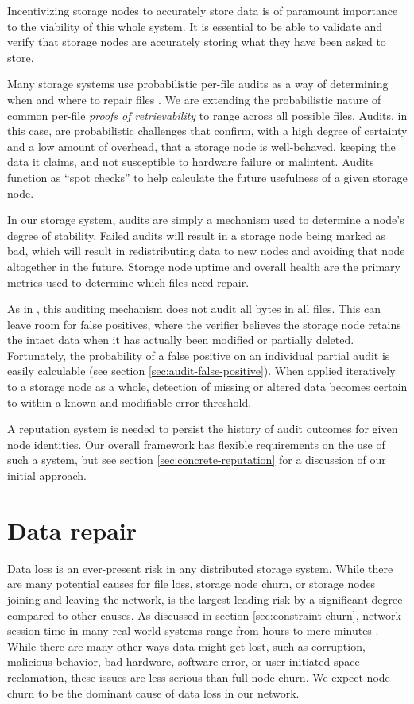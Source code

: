 \documentclass[8pt,fleqn,openany]{book}
\begin{document}
Incentivizing storage nodes to accurately store data is of paramount importance
to
the viability of this whole system. It is essential to be able to
validate and verify that storage nodes are accurately storing what they have
been
asked to store.

Many storage systems use probabilistic per-file audits as a way of determining
when and where to repair files \cite{juels, shacham}.
We are extending the probabilistic nature of common per-file
{\em proofs of retrievability} to range across all possible files.
Audits, in this case, are probabilistic challenges that confirm, with a high
degree of certainty and a low amount of overhead, that a storage node is
well-behaved, keeping the data it claims, and not susceptible to hardware
failure or malintent. Audits function as ``spot checks'' \cite{juels2} to help
calculate the future usefulness of a given storage node.

In our storage system,
audits are simply a mechanism used to determine a node's degree of stability.
Failed audits will result in a storage node being marked as bad, which
will result in redistributing data to new nodes and avoiding that node altogether
in the future. Storage node uptime and overall health are the primary metrics
used to determine which files need repair.

As in \cite{juels, shacham}, this auditing mechanism does not audit
all bytes in all files. This can
leave room for false positives, where the verifier believes the storage node
retains the intact data when it has actually been modified or partially
deleted. Fortunately, the probability of a false positive on an individual
partial audit is easily calculable (see section
\ref{sec:audit-false-positive}). When applied
iteratively to a storage node as a whole, detection of missing or altered data
becomes certain to within a known and modifiable error threshold.

A reputation system is needed to persist the history of audit outcomes for
given node identities. Our overall framework has flexible requirements on the use
of such a system, but see section \ref{sec:concrete-reputation} for a
discussion of our initial approach.

\section{Data repair}

Data loss is an ever-present risk in any distributed storage system. While there
are many potential causes for file loss, storage node churn, or storage
nodes joining and leaving the network, is the largest leading risk by a
significant degree compared to other causes.
As discussed in section \ref{sec:constraint-churn}, network session time in
many real world systems range from hours to mere minutes \cite{dht-churn}.
While there are many other ways data might get lost, such as corruption,
malicious behavior, bad hardware, software error, or user initiated space
reclamation, these issues are less serious than full node churn. We expect
node churn to be the dominant cause of data loss in our network.
\end{document}
